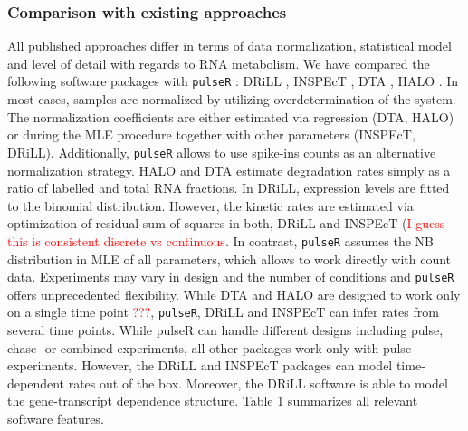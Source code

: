 \subsubsection*{Comparison with existing approaches}
All published approaches differ in terms of 
data normalization, statistical model and level of detail with regards to 
RNA metabolism. We have compared the following software packages with \verb|pulseR| :
DRiLL \citep{rabani2014high},
INSPEcT \citep{de2015inspect},
DTA \citep{schwalb2012measurement},
HALO \citep{friedel2010halo}.
In most cases, samples are normalized by utilizing overdetermination of the system.
The normalization coefficients are either estimated via regression
(DTA, HALO) or during the MLE procedure together  
with other parameters (INSPEcT, DRiLL). 
Additionally, 
\verb|pulseR| allows to use spike-ins counts as an alternative normalization strategy.
HALO and DTA estimate degradation rates simply as  a ratio of labelled and
total RNA fractions.
In DRiLL, expression levels are fitted to the binomial distribution. 
However, the kinetic rates are estimated via optimization of residual sum of squares in both, DRiLL and 
INSPEcT (\textcolor{red}{I guess this is consistent discrete vs continuous}. 
In contrast, \verb|pulseR| assumes the NB distribution
in MLE of all parameters, which allows to work directly with count data.
Experiments may vary in design and the number of conditions and \verb|pulseR| offers unprecedented flexibility.
While DTA and HALO are designed to work only on a single time
point \textcolor{red}{???}, \verb|pulseR|, DRiLL and INSPEcT can infer rates from several time points.
While pulseR can handle different designs including pulse, chase- or combined 
experiments, all other packages work only with pulse experiments.
However, the DRiLL and INSPEcT packages can model 
time-dependent rates out of the box.
Moreover, the DRiLL software is able to model the gene-transcript dependence structure.
Table 1 summarizes all relevant software features.

